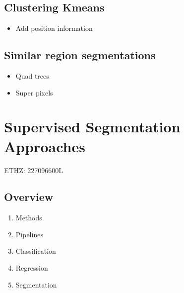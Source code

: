 \documentclass[letterpaper,10pt,english]{sphinxmanual}
\begin{document}
\section{Clustering \sphinxhyphen{} K\sphinxhyphen{}means}
\label{\detokenize{05-AdvancedSegmentation:clustering-k-means}}\begin{itemize}
\item {} 
\sphinxAtStartPar
Add position information

\end{itemize}


\section{Similar region segmentations}
\label{\detokenize{05-AdvancedSegmentation:similar-region-segmentations}}\begin{itemize}
\item {} 
\sphinxAtStartPar
Quad trees

\item {} 
\sphinxAtStartPar
Super pixels

\end{itemize}


\chapter{Supervised Segmentation Approaches}
\label{\detokenize{05-SupervisedSegmentation:supervised-segmentation-approaches}}\label{\detokenize{05-SupervisedSegmentation::doc}}




\sphinxAtStartPar
{} ETHZ: 227\sphinxhyphen{}0966\sphinxhyphen{}00L

\sphinxAtStartPar
{}






\section{Overview}
\label{\detokenize{05-SupervisedSegmentation:overview}}\begin{enumerate}
%
\item {} 
\sphinxAtStartPar
Methods

\item {} 
\sphinxAtStartPar
Pipelines

\item {} 
\sphinxAtStartPar
Classification

\item {} 
\sphinxAtStartPar
Regression

\item {} 
\sphinxAtStartPar
Segmentation

\end{enumerate}
\end{document}
